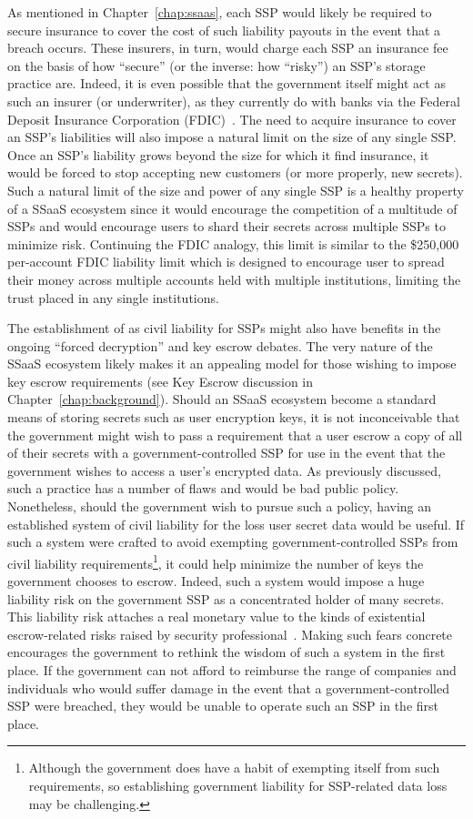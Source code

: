 As mentioned in Chapter~\ref{chap:ssaas}, each SSP would likely be
required to secure insurance to cover the cost of such liability
payouts in the event that a breach occurs. These insurers, in turn,
would charge each SSP an insurance fee on the basis of how ``secure''
(or the inverse: how ``risky'') an SSP's storage practice are. Indeed,
it is even possible that the government itself might act as such an
insurer (or underwriter), as they currently do with banks via the
Federal Deposit Insurance Corporation (FDIC)~\cite{fdic}. The need to
acquire insurance to cover an SSP's liabilities will also impose a
natural limit on the size of any single SSP. Once an SSP's liability
grows beyond the size for which it find insurance, it would be forced
to stop accepting new customers (or more properly, new secrets). Such
a natural limit of the size and power of any single SSP is a healthy
property of a SSaaS ecosystem since it would encourage the competition
of a multitude of SSPs and would encourage users to shard their
secrets across multiple SSPs to minimize risk. Continuing the FDIC
analogy, this limit is similar to the \$250,000 per-account FDIC
liability limit which is designed to encourage user to spread their
money across multiple accounts held with multiple institutions,
limiting the trust placed in any single institutions.

The establishment of as civil liability for SSPs might also have
benefits in the ongoing ``forced decryption'' and key escrow
debates. The very nature of the SSaaS ecosystem likely makes it an
appealing model for those wishing to impose key escrow requirements
(see Key Escrow discussion in Chapter~\ref{chap:background}). Should
an SSaaS ecosystem become a standard means of storing secrets such as
user encryption keys, it is not inconceivable that the government
might wish to pass a requirement that a user escrow a copy of all of
their secrets with a government-controlled SSP for use in the event
that the government wishes to access a user's encrypted data. As
previously discussed, such a practice has a number of flaws and would
be bad public policy. Nonetheless, should the government wish to
pursue such a policy, having an established system of civil liability
for the loss user secret data would be useful. If such a system were
crafted to avoid exempting government-controlled SSPs from civil
liability requirements\footnote{Although the government does have a
  habit of exempting itself from such requirements, so establishing
  government liability for SSP-related data loss may be challenging.},
it could help minimize the number of keys the government chooses to
escrow. Indeed, such a system would impose a huge liability risk on
the government SSP as a concentrated holder of many secrets. This
liability risk attaches a real monetary value to the kinds of
existential escrow-related risks raised by security
professional~\cite{abelson2015}. Making such fears concrete encourages
the government to rethink the wisdom of such a system in the first
place. If the government can not afford to reimburse the range of
companies and individuals who would suffer damage in the event that a
government-controlled SSP were breached, they would be unable to
operate such an SSP in the first place.

